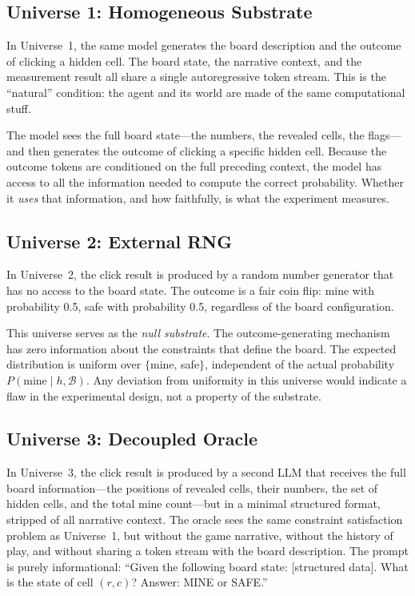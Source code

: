 \documentclass[12pt,a4paper]{article}
\begin{document}
\subsection{Universe 1: Homogeneous Substrate}
\label{sec:universe1}

In Universe~1, the same model generates the board description and the outcome of clicking a hidden cell. The board state, the narrative context, and the measurement result all share a single autoregressive token stream. This is the ``natural'' condition: the agent and its world are made of the same computational stuff.

The model sees the full board state---the numbers, the revealed cells, the flags---and then generates the outcome of clicking a specific hidden cell. Because the outcome tokens are conditioned on the full preceding context, the model has access to all the information needed to compute the correct probability. Whether it \emph{uses} that information, and how faithfully, is what the experiment measures.

\subsection{Universe 2: External RNG}
\label{sec:universe2}

In Universe~2, the click result is produced by a random number generator that has no access to the board state. The outcome is a fair coin flip: mine with probability 0.5, safe with probability 0.5, regardless of the board configuration.

This universe serves as the \emph{null substrate}. The outcome-generating mechanism has zero information about the constraints that define the board. The expected distribution is uniform over $\{$mine, safe$\}$, independent of the actual probability $P(\text{mine} \mid h, \mathcal{B})$. Any deviation from uniformity in this universe would indicate a flaw in the experimental design, not a property of the substrate.

\subsection{Universe 3: Decoupled Oracle}
\label{sec:universe3}

In Universe~3, the click result is produced by a second LLM that receives the full board information---the positions of revealed cells, their numbers, the set of hidden cells, and the total mine count---but in a minimal structured format, stripped of all narrative context. The oracle sees the same constraint satisfaction problem as Universe~1, but without the game narrative, without the history of play, and without sharing a token stream with the board description. The prompt is purely informational: ``Given the following board state: [structured data]. What is the state of cell $(r,c)$? Answer: MINE or SAFE.''
\end{document}
